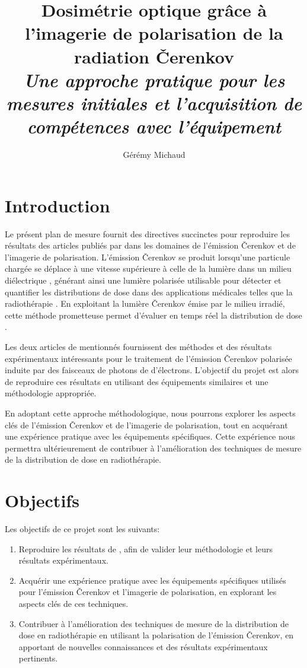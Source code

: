 \documentclass{Thesis}
\title{Dosimétrie optique grâce à l'imagerie de polarisation de la radiation Čerenkov
\\\Large{\textit{Une approche pratique pour les mesures initiales et l'acquisition de compétences avec l'équipement}}}
\author{Gérémy Michaud}{G. Michaud}
\begin{document}
\section*{Introduction}
Le présent plan de mesure fournit des directives succinctes pour reproduire les
résultats des articles publiés par  \cite{cloutierAccurateDoseMeasurements2022, cloutierDirectInwaterRadiation2022}
dans les domaines de l'émission Čerenkov et de l'imagerie de polarisation.
L'émission Čerenkov se produit lorsqu'une particule chargée se déplace à une vitesse supérieure à celle de la lumière
dans un milieu diélectrique \cite{cerenkovVisibleRadiationProduced1937},
générant ainsi une lumière polarisée utilisable pour détecter et quantifier les distributions de dose dans des applications médicales telles que la radiothérapie \cite{ashrafDosimetryFLASHRadiotherapy2020}.
En exploitant la lumière Čerenkov émise par le milieu irradié, cette méthode prometteuse permet d'évaluer en temps réel la distribution de dose \cite{jarvisCherenkovVideoImaging2014}.

Les deux articles de  mentionnés fournissent des méthodes et des résultats expérimentaux
intéressants pour le traitement de l'émission Čerenkov polarisée induite par des faisceaux de photons de d'électrons.
L'objectif du projet est alors de reproduire ces résultats en utilisant des équipements similaires et une méthodologie appropriée.

En adoptant cette approche méthodologique, nous pourrons explorer les aspects clés de
l'émission Čerenkov et de l'imagerie de polarisation, tout en acquérant une expérience
pratique avec les équipements spécifiques. Cette expérience nous permettra ultérieurement de contribuer
à l'amélioration des techniques de mesure de la distribution de dose en radiothérapie.

\section*{Objectifs}
Les objectifs de ce projet sont les suivants:
\begin{enumerate}
    \setlength\itemsep{1mm}
    \item Reproduire les résultats de , afin de valider leur méthodologie et leurs résultats expérimentaux.
    \item Acquérir une expérience pratique avec les équipements spécifiques utilisés pour l'émission Čerenkov et l'imagerie de polarisation, en explorant les aspects clés de ces techniques.
    \item Contribuer à l'amélioration des techniques de mesure de la distribution de dose en radiothérapie en utilisant la polarisation de l'émission Čerenkov, en apportant de nouvelles connaissances et des résultats expérimentaux pertinents.
\end{enumerate}
\end{document}
